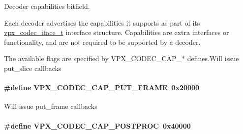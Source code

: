 Decoder capabilities bitfield. 

Each decoder advertises the capabilities it supports as part of its \hyperlink{group__codec_gad654f3da60151f5dfef70aca00ef1e9e}{vpx\-\_\-codec\-\_\-iface\-\_\-t} interface structure. Capabilities are extra interfaces or functionality, and are not required to be supported by a decoder.

The available flags are specified by V\-P\-X\-\_\-\-C\-O\-D\-E\-C\-\_\-\-C\-A\-P\-\_\-$\ast$ defines.\-Will issue put\-\_\-slice callbacks \hypertarget{group__decoder_ga0ef59ca8067ac1dc8c8378042277ccc8}{
\paragraph[{V\-P\-X\-\_\-\-C\-O\-D\-E\-C\-\_\-\-C\-A\-P\-\_\-\-P\-U\-T\-\_\-\-F\-R\-A\-M\-E}]{\setlength{\rightskip}{0pt plus 5cm}\#define V\-P\-X\-\_\-\-C\-O\-D\-E\-C\-\_\-\-C\-A\-P\-\_\-\-P\-U\-T\-\_\-\-F\-R\-A\-M\-E~0x20000}}\label{group__decoder_ga0ef59ca8067ac1dc8c8378042277ccc8}
Will issue put\-\_\-frame callbacks \hypertarget{group__decoder_ga7825ade982ab85a5583d3d8a669baa3b}{
\paragraph[{V\-P\-X\-\_\-\-C\-O\-D\-E\-C\-\_\-\-C\-A\-P\-\_\-\-P\-O\-S\-T\-P\-R\-O\-C}]{\setlength{\rightskip}{0pt plus 5cm}\#define V\-P\-X\-\_\-\-C\-O\-D\-E\-C\-\_\-\-C\-A\-P\-\_\-\-P\-O\-S\-T\-P\-R\-O\-C~0x40000}}\label{group__decoder_ga7825ade982ab85a5583d3d8a669baa3b}
